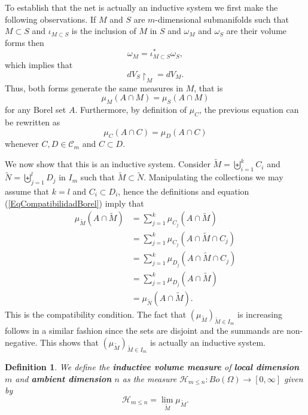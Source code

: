 \documentclass[%
 aip,
 amsmath,amssymb,
 reprint,%
jmp]{revtex4-2}
\newtheorem*{definition}{Definition}
\begin{document}
To establish that the net is actually an inductive system we first make the following observations. If $M$ and $S$ are $m$-dimensional submanifolds such that $M\subset S$ and $\iota_{M\subset S}$ is the inclusion of $M$ in $S$ and $\omega_{M}$ and $\omega_{S}$ are their volume forms then
\begin{equation*}
    \omega_{M} = \iota_{M\subset S}^{\ast}\omega_{S},
\end{equation*}
which implies that
\begin{equation*}
    dV_{S}\restriction_{M} = dV_{M}.
\end{equation*}
Thus, both forms generate the same measures in $M$, that is
\begin{equation*}
    \mu_{M}(A\cap M) = \mu_{S}(A\cap M)
\end{equation*}
for any Borel set $A$. Furthermore, by definition of $\mu_{C}$, the previous equation can be rewritten as
\begin{equation}\label{EqCompatibilidadBorel}
    \mu_{C}(A\cap C) = \mu_{D}(A\cap C)
\end{equation}
whenever $C,D\in\mathcal{C}_{m}$ and $C\subset D$.

We now show that this is an inductive system. Consider $\tilde{M} = \biguplus_{i=1}^{k}C_{i}$ and $\tilde{N}  = \biguplus_{j=1}^{l}D_{j}$ in $I_{m}$ such that $\tilde{M} \subset \tilde{N}$. Manipulating the collections we may assume that $k = l$ and $C_{i} \subset D_{i}$, hence the definitions and equation (\ref{EqCompatibilidadBorel}) imply that
\begin{align*}
    \mu_{\tilde{M}}(A\cap \tilde{M}) &= \sum_{j=1}^{k} \mu_{C_{j}}(A\cap \tilde{M})\\
    &= \sum_{j=1}^{k} \mu_{C_{j}}(A \cap \tilde{M}\cap C_{j})\\
    &= \sum_{j=1}^{k} \mu_{D_{j}}(A \cap \tilde{M} \cap C_{j})\\
    &= \sum_{j=1}^{k} \mu_{D_{j}}(A \cap \tilde{M})\\
    &= \mu_{\tilde{N}}(A\cap \tilde{M}).
\end{align*}
This is the compatibility condition. The fact that $(\mu_{\tilde{M}})_{\tilde{M}\in I_{m}}$ is increasing follows in a similar fashion since the sets are disjoint and the summands are non-negative. This shows that $(\mu_{\tilde{M}})_{\tilde{M}\in I_{m}}$ is actually an inductive system.

\begin{definition}
We define the \textbf{inductive volume measure} of \textbf{local dimension} $m$ and \textbf{ambient dimension} $n$ as the measure $\mathcal{H}_{m\leq n}\colon Bo(\Omega) \to [0,\infty]$ given by
\begin{equation*}
    \mathcal{H}_{m\leq n} = \lim_{\tilde{M}}\mu_{\tilde{M}}.
\end{equation*}
\end{definition}
\end{document}

